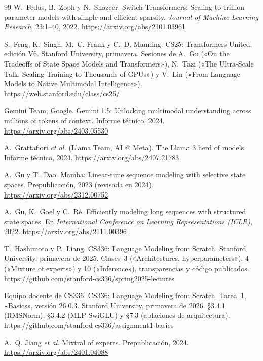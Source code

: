 \begin{thebibliography}{99}
W.~Fedus, B.~Zoph y N.~Shazeer.
\newblock Switch Transformers: Scaling to trillion parameter models with simple and efficient sparsity.
\newblock \emph{Journal of Machine Learning Research}, 23:1--40, 2022.
\newblock \url{https://arxiv.org/abs/2101.03961}

S.~Feng, K.~Singh, M.~C. Frank y C.~D. Manning.
\newblock CS25: Transformers United, edición V6.
\newblock Stanford University, primavera. Sesiones de A.~Gu («On the Tradeoffs of State Space Models and Transformers»), N.~Tazi («The Ultra-Scale Talk: Scaling Training to Thousands of GPUs») y V.~Lin («From Language Models to Native Multimodal Intelligence»).
\newblock \url{https://web.stanford.edu/class/cs25/}

Gemini Team, Google.
\newblock Gemini 1.5: Unlocking multimodal understanding across millions of tokens of context.
\newblock Informe técnico, 2024.
\newblock \url{https://arxiv.org/abs/2403.05530}

A.~Grattafiori \emph{et al.} (Llama Team, AI @ Meta).
\newblock The Llama 3 herd of models.
\newblock Informe técnico, 2024.
\newblock \url{https://arxiv.org/abs/2407.21783}

A.~Gu y T.~Dao.
\newblock Mamba: Linear-time sequence modeling with selective state spaces.
\newblock Prepublicación, 2023 (revisada en 2024).
\newblock \url{https://arxiv.org/abs/2312.00752}

A.~Gu, K.~Goel y C.~Ré.
\newblock Efficiently modeling long sequences with structured state spaces.
\newblock En \emph{International Conference on Learning Representations (ICLR)}, 2022.
\newblock \url{https://arxiv.org/abs/2111.00396}

T.~Hashimoto y P.~Liang.
\newblock CS336: Language Modeling from Scratch.
\newblock Stanford University, primavera de 2025. Clases~3 («Architectures, hyperparameters»), 4 («Mixture of experts») y 10 («Inference»), transparencias y código publicados.
\newblock \url{https://github.com/stanford-cs336/spring2025-lectures}

Equipo docente de CS336.
\newblock CS336: Language Modeling from Scratch. Tarea~1, «Basics», versión 26.0.3.
\newblock Stanford University, primavera de 2026. §3.4.1 (RMSNorm), §3.4.2 (MLP SwiGLU) y §7.3 (ablaciones de arquitectura).
\newblock \url{https://github.com/stanford-cs336/assignment1-basics}

A.~Q. Jiang \emph{et al.}
\newblock Mixtral of experts.
\newblock Prepublicación, 2024.
\newblock \url{https://arxiv.org/abs/2401.04088}


\end{thebibliography}
